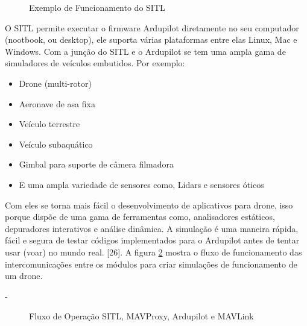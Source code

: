 %
\begin{figure}[H]
	\centering
	\caption{Exemplo de Funcionamento do SITL}
	\fontsize{9pt}{12pt}\selectfont
	\def\svgwidth{15cm}
	
	\label{fig:sitl}
\end{figure}

O SITL permite executar o firmware Ardupilot diretamente no seu computador (nootbook, ou desktop), ele suporta várias plataformas entre elas Linux, Mac e Windows.
Com a junção do SITL e o Ardupilot se tem uma ampla gama de simuladores de veículos embutidos. Por exemplo:
\begin{itemize}
    \item Drone (multi-rotor)
    \item Aeronave de asa fixa
    \item Veículo terrestre
    \item Veículo subaquático
    \item Gimbal para suporte de câmera filmadora
    \item E uma ampla variedade de sensores como, Lidars e sensores óticos
\end{itemize}

Com eles se torna mais fácil o desenvolvimento de aplicativos para drone, isso porque dispõe de uma gama de ferramentas como, analisadores estáticos, depuradores interativos e análise dinâmica. A simulação é uma maneira rápida, fácil e segura de testar códigos implementados para o Ardupilot antes de tentar usar (voar) no mundo real. [26]. A figura \ref{fig:ardupilot} mostra o fluxo de funcionamento das intercomunicações entre os módulos para criar simulações de funcionamento de um drone.

-
\begin{figure}[H]
	\centering
	\caption{Fluxo de Operação SITL, MAVProxy, Ardupilot e MAVLink}
	\fontsize{9pt}{12pt}\selectfont
	\color{white}
	\def\svgwidth{15cm}
	
	\label{fig:ardupilot}
\end{figure}

